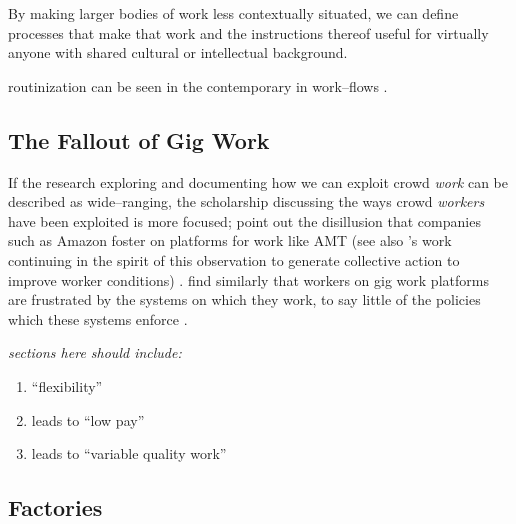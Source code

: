 \documentclass{sigchi}
\begin{document}
By making larger bodies of work less contextually situated,
we can define processes that make that work
and the instructions thereof
useful for virtually anyone with shared cultural or intellectual background.

routinization can be seen in the contemporary in work--flows
\cite{foundry,bernstein2015soylent}.




\subsection{The Fallout of Gig Work}\label{sec:Fallout}
If the research exploring and documenting how we can exploit crowd \textit{work} can be described as wide--ranging,
the scholarship discussing the ways crowd \textit{workers} have been exploited is more focused;
\citeauthor{turkopticon} point out the disillusion that companies such as Amazon foster on platforms for work like AMT
(see also \citeauthor{dynamo}'s work
continuing in the spirit of this observation to generate collective action to improve worker conditions)
\cite{turkopticon,dynamo}.
\citeauthor{uberAlgorithm}
find similarly that workers on gig work platforms are frustrated by the systems on which they work,
to say little of the policies which these systems enforce
\cite{uberAlgorithm}.

\itshape
sections here should include:
\begin{enumerate}
\item ``flexibility'' \cite{friedman2014workers,DesigningForLabourUber}
\item leads to ``low pay'' \cite{turkopticon,dynamo}
\item leads to ``variable quality work''
\end{enumerate}


\upshape

\subsection{Factories}



\end{document}
